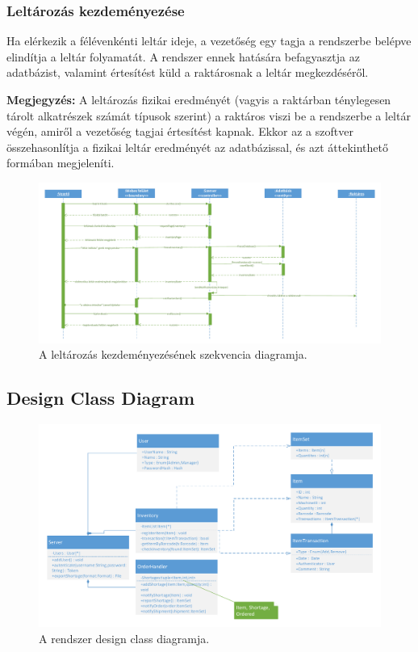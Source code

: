 \documentclass[12pt]{article}\usepackage[left=20mm,right=20mm,top=14mm,bottom=20mm]{geometry}
\begin{document}
\thispagestyle{empty}
\begin{landscape}
\subsubsection{Leltározás kezdeményezése}
Ha elérkezik a félévenkénti leltár ideje, a vezetőség egy tagja a rendszerbe belépve elindítja a leltár folyamatát. 
A rendszer ennek hatására befagyasztja az adatbázist, valamint értesítést küld a raktárosnak a leltár megkezdéséről. 
\vspace{5mm}

\noindent\textbf{Megjegyzés:} A leltározás fizikai eredményét (vagyis a raktárban ténylegesen tárolt alkatrészek számát típusok szerint) a raktáros viszi be a rendszerbe a leltár végén, amiről a vezetőség tagjai értesítést kapnak. 
Ekkor az a szoftver összehasonlítja a fizikai leltár eredményét az adatbázissal, és azt áttekinthető formában megjeleníti. 

\begin{figure}[!h]
    \centering
        \includegraphics[width=1.4\textwidth]{kepek/leltar_szekvencia.pdf}
        \caption{A leltározás kezdeményezésének szekvencia diagramja.}
\end{figure}
\end{landscape}

\thispagestyle{empty}
\begin{landscape}
\subsection{Design Class Diagram}
\begin{figure}[!h]
    \centering
        \includegraphics[width=1.4\textwidth]{kepek/dcd.pdf}
        \caption{A rendszer design class diagramja.}
\end{figure}
\end{landscape}
\end{document}
